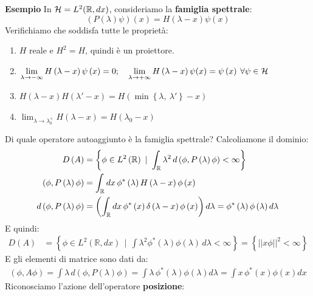 \documentclass[../../FisicaTeorica.tex]{subfiles}
\begin{document}
\textbf{Esempio} 
In $\mathcal{H} =L^2(\mathbb{R}, dx)$, consideriamo la \textbf{famiglia spettrale}:
\[
\left(P\left(\lambda\right)\psi\right)\left(x\right)=H\left(\lambda-x\right)\psi \left(x\right)
\]
Verifichiamo che soddisfa tutte le proprietà:
\begin{enumerate}
    \item $H$ reale e $H^2=H$, quindi è un proiettore.
    \item 
    $\displaystyle \lim_{\lambda\rightarrow-\infty}{H\left(\lambda-x\right)\psi\left(x\right)=0};
    \quad
	\lim_{\lambda\rightarrow+\infty}{H\left(\lambda-x\right)\psi(x)}=\psi
	\left(x\right)\>\forall \psi \in \mathcal{H} $
    \item 
    $\displaystyle H\left(\lambda-x\right)H\left(\lambda '-x\right)=H\left(\min{\left\{\lambda,\ \lambda '\right\}}-x\right)$
    \item 
    $\displaystyle \lim_{\lambda\rightarrow\lambda_0^+}{H\left(\lambda-x\right)}=H\left(\lambda_0-x\right)$
\end{enumerate}
Di quale operatore autoaggiunto è la famiglia spettrale? Calcoliamone il dominio:
\begin{align*}
D\left(A\right)&= \left\{\phi\in L^2\left(\mathbb{R}\right)\ |\ \int_\bb{R}\lambda^2\, d\left(\phi,P\left(\lambda\right)\phi\right)<\infty\right\}\\
\left(\phi,P\left(\lambda\right)\phi\right)&=\int_\bb{R} dx\, \phi^\ast\left(\lambda\right)H\left(\lambda-x\right)\phi \left(x\right)\\
d\left(\phi,P\left(\lambda\right)\phi\right)&=\left(\int_\bb{R} dx\,\phi^\ast\left(x\right)\delta\left(\lambda-x\right)\phi\left(x\right)\right)d\lambda =\phi^\ast\left(\lambda\right)\phi \left(\lambda\right)d\lambda 
\end{align*}
E quindi:
\begin{align*}
D\left(A\right)&= \left\{\phi\in L^2\left(\mathbb{R},dx\right)\ \ |\ \ \int\lambda^2\phi^\ast\left(\lambda\right)\phi\left(\lambda\right)\,d\lambda<\infty\right\}= \left\{\left|\left|x\phi\right|\right|^2<\infty\right\}
\end{align*}
E gli elementi di matrice sono dati da:
\begin{align*}
    \left(\phi,A\phi\right)=\int \lambda\, d\left(\phi,P\left(\lambda\right)\phi\right)= \int \lambda\,\phi^\ast\left(\lambda\right)\phi \left(\lambda\right)d\lambda =\int x\,\phi^\ast\left(x\right)\phi \left(x\right)dx
\end{align*}
Riconosciamo l'azione dell'operatore \textbf{posizione}:
\end{document}
